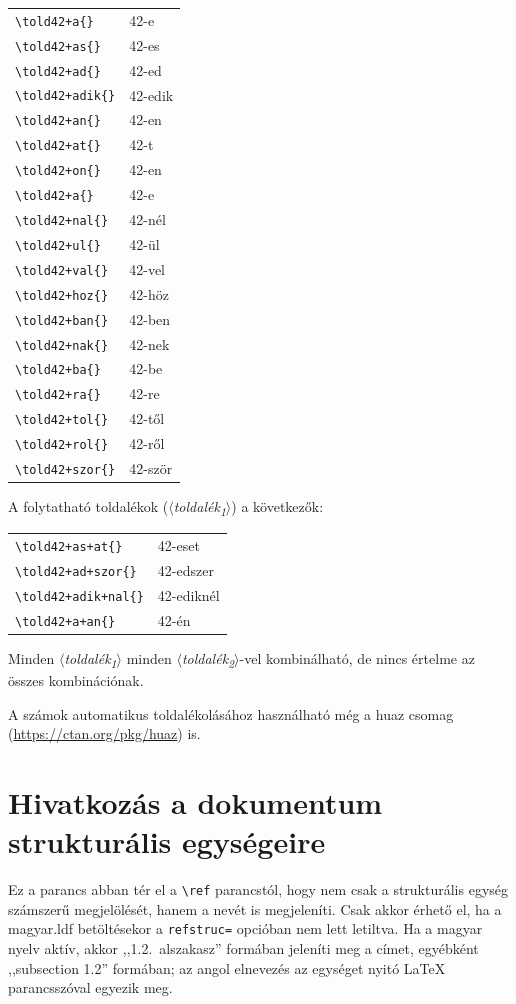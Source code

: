 \documentclass[12pt]{article}
\newcommand\param[1]{{\normalfont\slshape$\langle$#1$\rangle$}}
\begin{document}
\begin{longtable}[l]{l|l}
\verb|\told42+a{}| & 42-e\\
\verb|\told42+as{}| & 42-es\\
\verb|\told42+ad{}| & 42-ed\\
\verb|\told42+adik{}| & 42-edik\\
\verb|\told42+an{}| & 42-en\\
\verb|\told42+at{}| & 42-t\\
\verb|\told42+on{}| & 42-en\\
\verb|\told42+a{}| & 42-e\\
\verb|\told42+nal{}| & 42-nél\\
\verb|\told42+ul{}| & 42-ül\\
\verb|\told42+val{}| & 42-vel\\
\verb|\told42+hoz{}| & 42-höz\\
\verb|\told42+ban{}| & 42-ben\\
\verb|\told42+nak{}| & 42-nek\\
\verb|\told42+ba{}| & 42-be\\
\verb|\told42+ra{}| & 42-re\\
\verb|\told42+tol{}| & 42-től\\
\verb|\told42+rol{}| & 42-ről\\
\verb|\told42+szor{}| & 42-ször
\end{longtable}
\noindent
A folytatható toldalékok (\param{toldalék\textsubscript1}) a következők:

\begin{longtable}[l]{l|l}
\verb|\told42+as+at{}| & 42-eset\\
\verb|\told42+ad+szor{}| & 42-edszer\\
\verb|\told42+adik+nal{}| & 42-ediknél\\
\verb|\told42+a+an{}| & 42-én
\end{longtable}
\noindent
Minden \param{toldalék\textsubscript1} minden \param{toldalék\textsubscript2}-vel kombinálható, de nincs értelme az összes kombinációnak.

A számok automatikus toldalékolásához használható még a \textsf{huaz} csomag (\url{https://ctan.org/pkg/huaz}) is.

\section{Hivatkozás a dokumentum strukturális egységeire}\label{sec-hivatkozas}

\begin{latexcode}
\refstruc{(*\param{szám}*)(*\normalfont[*)+(*\param{toldalékok}*)(*\normalfont]*)}
\end{latexcode}
Ez a parancs abban tér el a \verb|\ref| parancstól, hogy nem csak a strukturális egység számszerű megjelölését, hanem a nevét is megjeleníti.
Csak akkor érhető el, ha a \textsf{magyar.ldf} betöltésekor a \texttt{refstruc=} opcióban nem lett letiltva.
Ha a magyar nyelv aktív, akkor ,,1.2.~alszakasz'' formában jeleníti meg a
címet, egyébként ,,subsection 1.2'' formában; az angol elnevezés az egységet nyitó \LaTeX{} parancsszóval egyezik meg.
\end{document}

